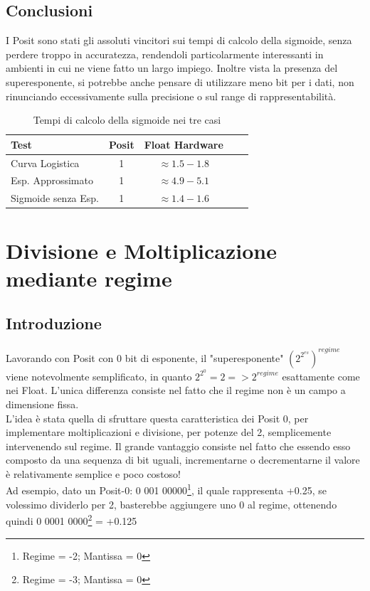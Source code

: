 \documentclass[a4paper,11pt]{article}
\begin{document}
\subsection{Conclusioni}
I Posit sono stati gli assoluti vincitori sui tempi di calcolo della sigmoide, senza perdere troppo in accuratezza, rendendoli particolarmente interessanti in ambienti in cui ne viene fatto un largo impiego. Inoltre vista la presenza del superesponente, si potrebbe anche pensare di utilizzare meno bit per i dati, non rinunciando eccessivamente sulla precisione o sul range di rappresentabilità.

\begin{table}[ht]
	\centering
	\begin{tabular}{l*{3}{c}r}
		Test              & Posit &Float Hardware \\
		\hline
		Curva Logistica 				& 1 & $\approx1.5-1.8$    	\\
		Esp. Approssimato  				& 1 & $\approx4.9-5.1$		\\
		Sigmoide senza Esp.           	& 1 & $\approx1.4-1.6$		\\
		\hline
	\end{tabular}
	\caption{Tempi di calcolo della sigmoide nei tre casi}
\end{table}


\newpage
\section{Divisione e Moltiplicazione mediante regime}
\subsection{Introduzione}

Lavorando con Posit con 0 bit di esponente, il "superesponente" $(2^{2^{es}})^{regime}$ viene notevolmente semplificato, in quanto $2^{2^{0}} = 2 => 2^{regime} $ esattamente come nei Float. L'unica differenza consiste nel fatto che il regime non è un campo a dimensione fissa.\\ L'idea è stata quella di sfruttare questa caratteristica dei Posit 0, per implementare moltiplicazioni e divisione, per potenze del 2, semplicemente intervenendo sul regime. Il grande vantaggio consiste nel fatto che essendo esso composto da una sequenza di bit uguali, incrementarne o decrementarne il valore è relativamente semplice e poco costoso!\\
Ad esempio, dato un Posit-0: 0 001 00000\footnote{Regime = -2; Mantissa = 0}, il quale rappresenta +0.25, se volessimo dividerlo per 2, basterebbe aggiungere uno 0 al regime, ottenendo quindi 0 0001 0000\footnote{Regime = -3; Mantissa = 0} = +0.125
\end{document}
